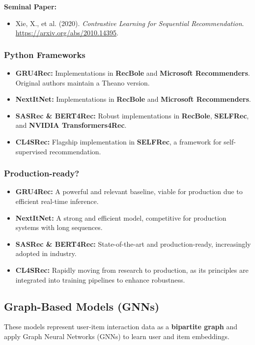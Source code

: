 \documentclass{article}
\begin{document}
\noindent\textbf{Seminal Paper:}
    \begin{itemize}
        \item Xie, X., et al. (2020). \textit{Contrastive Learning for Sequential Recommendation}. \url{https://arxiv.org/abs/2010.14395}.
    \end{itemize}
    
    \subsubsection*{Python Frameworks}
    \begin{itemize}
        \item \textbf{GRU4Rec:} Implementations in \textbf{RecBole} and \textbf{Microsoft Recommenders}. Original authors maintain a Theano version.
        \item \textbf{NextItNet:} Implementations in \textbf{RecBole} and \textbf{Microsoft Recommenders}.
        \item \textbf{SASRec \& BERT4Rec:} Robust implementations in \textbf{RecBole}, \textbf{SELFRec}, and \textbf{NVIDIA Transformers4Rec}.
        \item \textbf{CL4SRec:} Flagship implementation in \textbf{SELFRec}, a framework for self-supervised recommendation.
    \end{itemize}
    
    \subsubsection*{Production-ready?}
    \begin{itemize}
        \item \textbf{GRU4Rec:} A powerful and relevant baseline, viable for production due to efficient real-time inference.
        \item \textbf{NextItNet:} A strong and efficient model, competitive for production systems with long sequences.
        \item \textbf{SASRec \& BERT4Rec:} State-of-the-art and production-ready, increasingly adopted in industry.
        \item \textbf{CL4SRec:} Rapidly moving from research to production, as its principles are integrated into training pipelines to enhance robustness.
    \end{itemize}
    
    \subsection{Graph-Based Models (GNNs)}
    These models represent user-item interaction data as a \textbf{bipartite graph} and apply Graph Neural Networks (GNNs) to learn user and item embeddings.
    
\end{document}
